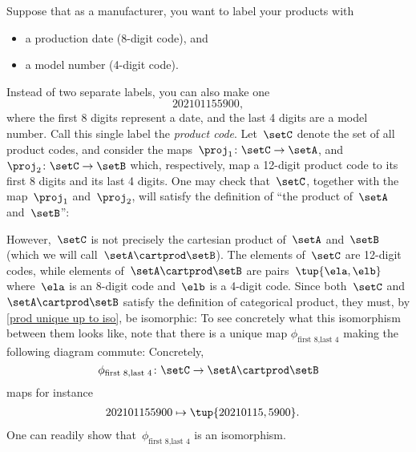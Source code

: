 \begin{example}
    \label{ex:univ-prop-prod}
    Suppose that as a manufacturer, you want to label your products with
    \begin{itemize}
        \item a production date (8-digit code), and
        \item a model number (4-digit code).
    \end{itemize}
    Instead of two separate labels, you can also make one
    \begin{equation}
        \label{eq:exa-prod-univ-prop-code}
        202101155900,
    \end{equation}
    where the first 8 digits represent a date, and the last 4 digits are a model number.
    Call this single label the \emph{product code}.
    Let~$\setC$ denote the set of all product codes, and consider the maps~$\proj_1\colon \setC\to \setA$, and~$\proj_2\colon \setC\to \setB$ which, respectively, map a 12-digit product code to its first 8 digits and its last 4 digits.
    One may check that~$\setC$, together with the map~$\proj_1$ and~$\proj_2$, will satisfy the definition of ``the product of~$\setA$ and~$\setB$'':


    However,~$\setC$ is not precisely the cartesian product of~$\setA$ and~$\setB$ (which we will call~$\setA\cartprod \setB$).
    The elements of~$\setC$ are 12-digit codes, while elements of~$\setA\cartprod \setB$ are pairs~$\tup{\ela,\elb}$ where~$\ela$ is an 8-digit code and~$\elb$ is a 4-digit code.
    Since both~$\setC$ and~$\setA\cartprod \setB$ satisfy the definition of categorical product, they must, by \cref{prod unique up to iso}, be isomorphic:
    To see concretely what this isomorphism between them looks like, note that there is a unique map $\phi_{\text{first 8},\text{last 4}}$ making the following diagram commute:
    Concretely,
    \begin{equation}
        \label{eq:exa-univ-iso}
        \phi_{\text{first 8},\text{last 4}}\colon \setC \to \setA\cartprod \setB
    \end{equation}
    maps for instance
    \begin{equation}
        \label{eq:exa-univ-iso-concrete}
        \begin{aligned}
            202101155900 & \mapsto \tup{20210115,5900}.
        \end{aligned}
    \end{equation}
    One can readily show that~$\phi_{\text{first 8},\text{last 4}}$ is an isomorphism.
\end{example}

